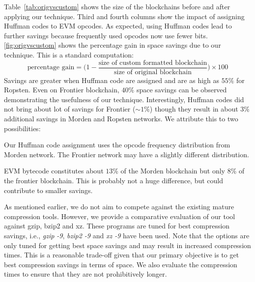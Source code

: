 \FloatBarrier
Table~\ref{tab:origvscustom} shows the size of the blockchains before and after applying our technique. Third and fourth columns show the impact of assigning Huffman codes to EVM opcodes. 
As expected, using Huffman codes lead to further savings because frequently
used opcodes now use fewer bits.
\autoref{fig:origvscustom} shows the percentage gain in space savings due to our technique. This is a standard computation:
\[ 
	\text{percentage gain} = \big ( 1 - \frac{\text{size of custom formatted blockchain}}{\text{size of original blockchain}}\big ) \times 100
\]
Savings are greater when Huffman code are assigned and are as high as $55\%$ for Ropsten. Even on Frontier blockchain, $40\%$ space savings can be observed demonstrating the usefulness of our technique. 
Interestingly, Huffman codes did not bring about lot of savings for Frontier ($\sim1\%$) though they result in about $3\%$ additional savings in Morden and Ropsten networks.
We attribute this to two possibilities:
\begin{enumerate*}
	\item Our Huffman code assignment uses the opcode frequency distribution from Morden network. The Frontier network may have a slightly different distribution.
	\item EVM bytecode constitutes about $13\%$ of the Morden blockchain  but only $8\%$ of the frontier blockchain. 
		This is probably not a huge difference, but could contribute to smaller savings.
\end{enumerate*}

As mentioned earlier, we do not aim to compete against the existing mature compression tools.
However, we provide a comparative evaluation of our tool against gzip, bzip2 and xz. 
These programs are tuned for best compression savings, i.e., \emph{gzip -9}, \emph{bzip2 -9} and \emph{xz -9} have been used. 
Note that the options are only tuned for getting best space savings and may result in increased compression times.
This is a reasonable trade-off given that our primary objective is to get best compression savings in terms of space.
We also evaluate the compression times to ensure that they are not
prohibitively longer.

